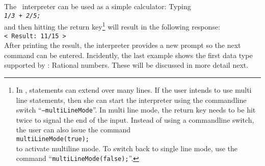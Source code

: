 \noindent
The \setlx\  interpreter can be used as a simple calculator:
Typing 
\\[0.2cm]
\hspace*{1.3cm}
\texttt{\textsl{1/3 + 2/5;}}
\\[0.2cm]
and then hitting the return key\footnote{
In \setlx, statements can extend over many lines.  If the user intends to use multi line
statements, then she can start the interpreter using the commandline switch ``\texttt{--multiLineMode}''.
In multi line mode, the return key needs to be hit twice to signal
the end of the input.  Instead of using a commandline switch, the user can also issue the command
\\
\hspace*{1.3cm}
\texttt{multiLineMode(true);}
\\
to activate multiline mode.
To switch back to single line mode, use the command ``\texttt{multiLineMode(false);}''.
} 
will result in the following response:
\\[0.2cm]
\hspace*{1.3cm}
\texttt{< Result: 11/15 >}
\\[0.2cm]
After printing the result, the interpreter provides a new prompt so the next command can
be entered.  Incidently, the last 
example shows the first data type supported by \setlx: Rational numbers. These will be discussed in
more detail next.


